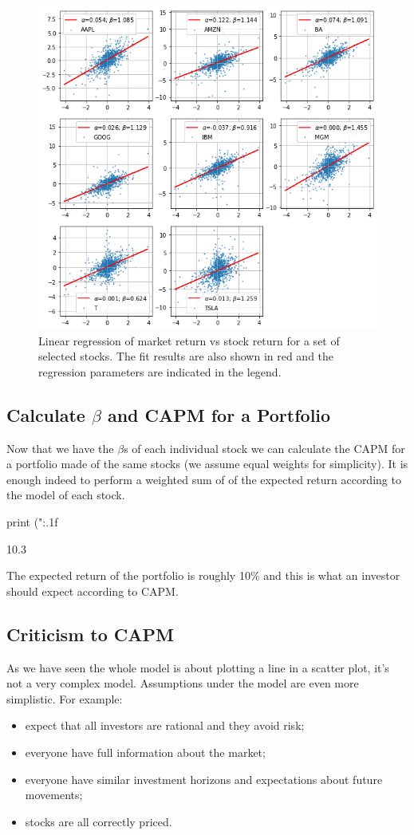\begin{figure}[htb]
	\centering
	\includegraphics[width=.8\textwidth]{figures/capm_fit.png}
	\caption{Linear regression of market return vs stock return for a set of selected stocks. The fit results are also shown in red and the regression parameters are indicated in the legend.}
	\label{fig:capm_fit}
\end{figure}

\subsection{Calculate $\beta$ and CAPM for a Portfolio}

Now that we have the $\beta$s of each individual stock we can calculate the CAPM for a portfolio made of the same stocks (we assume equal weights for simplicity).
It is enough indeed to perform a weighted sum of of the expected return according to the model of each stock.

\begin{ipython}
print ("{:.1f}%
\end{ipython}
\begin{ioutput}
10.3%
\end{ioutput}

The expected return of the portfolio is roughly 10\% and this is what an investor should expect according to CAPM.

\subsection{Criticism to CAPM}
As we have seen the whole model is about plotting a line in a scatter plot, it’s not a very complex model. Assumptions under the model are even more simplistic. For example:
\begin{itemize}
\tightlist
\item expect that all investors are rational and they avoid risk;
\item everyone have full information about the market;
\item everyone have similar investment horizons and expectations about future movements;
\item stocks are all correctly priced.
\end{itemize}

